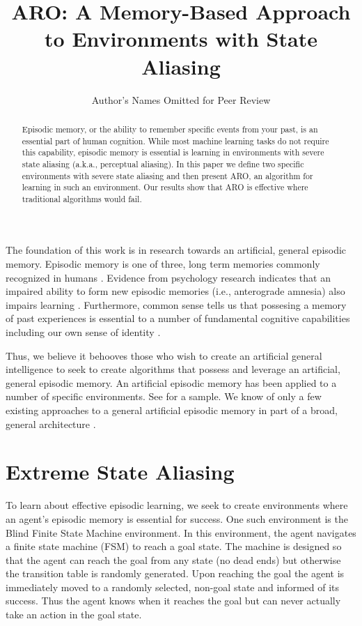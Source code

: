 \documentclass[letterpaper]{article} %
\title{ARO:  A Memory-Based Approach to Environments with State Aliasing }
\author{Author's Names Omitted for Peer Review
}
\begin{document}
\maketitle

\begin{abstract}
Episodic memory, or the ability to remember specific events from your
past, is an essential part of human cognition.  While most machine
learning tasks do not require this capability, episodic memory is
essential is learning in environments with severe state aliasing
(a.k.a., perceptual aliasing).  In this paper we define two specific
environments with severe state aliasing and then present ARO, an
algorithm for learning in such an environment.  Our results show that
ARO is effective where traditional algorithms would fail.
\end{abstract}

\noindent


The foundation of this work is in research towards an artificial,
general episodic memory.  Episodic memory is one of three, long term
memories commonly recognized in humans \cite{Tulving83}.  Evidence
from psychology research indicates that an impaired ability to form
new episodic memories (i.e., anterograde amnesia) also impairs
learning \cite{Brooks76}.  Furthermore, common sense tells us
that possesing a memory of past experiences is essential to a number
of fundamental cognitive capabilities including our own sense of
identity \cite{Holland10,Nuxoll12}.

Thus, we believe it behooves those who wish to create an artificial
general intelligence to seek to create algorithms that possess and
leverage an artificial, general episodic memory.  An artificial episodic
memory has been applied to a number of specific environments.
See \cite{Tecuci07,Brom08,Castro10,Chaudhry18} for a sample.  We know
of only a few existing approaches to a general artificial episodic
memory in part of a broad, general
architecture \cite{Boloni11,Nuxoll12,Menager16}.




\section{Extreme State Aliasing}
To learn about effective episodic learning, we seek to create
environments where an agent's episodic memory is essential for
success.  One such environment is the Blind Finite State Machine
environment.  In this environment, the agent navigates a finite state
machine (FSM) \cite{Hopcroft06} to reach a goal state.  The machine is
designed so that the agent can reach the goal from any state (no dead
ends) but otherwise the transition table is randomly generated.  Upon
reaching the goal the agent is immediately moved to a randomly
selected, non-goal state and informed of its success.  Thus the agent
knows when it reaches the goal but can never actually take an action
in the goal state.
\end{document}
